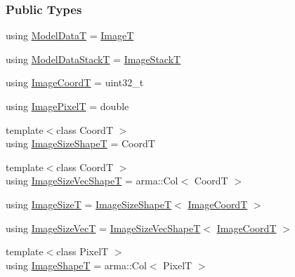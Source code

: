 \subsubsection*{Public Types}
\begin{DoxyCompactItemize}
\item 
using \hyperlink{classmappel_1_1PoissonNoise1DObjective_a0f72eebcb9fb785a5489fc5489bff9b0}{Model\+DataT} = \hyperlink{classmappel_1_1ImageFormat1DBase_a521a1ff391a52a636fac4aac7c7ba02c}{ImageT}
\item 
using \hyperlink{classmappel_1_1PoissonNoise1DObjective_a62f5cb009e4c0e53fdfbf90b3153b94f}{Model\+Data\+StackT} = \hyperlink{classmappel_1_1ImageFormat1DBase_a81e3246d1c5c37ebf9077b7b5bd25a76}{Image\+StackT}
\item 
using \hyperlink{classmappel_1_1ImageFormat1DBase_a82ab3168eb1a87eaeb3e7c919188e9fc}{Image\+CoordT} = uint32\+\_\+t
\item 
using \hyperlink{classmappel_1_1ImageFormat1DBase_a156fe500fd249cb4b77bdb0abc0dd0ea}{Image\+PixelT} = double
\item 
{\footnotesize template$<$class CoordT $>$ }\\using \hyperlink{classmappel_1_1ImageFormat1DBase_ab722bbd223963861691ef038721b6e02}{Image\+Size\+ShapeT} = CoordT
\item 
{\footnotesize template$<$class CoordT $>$ }\\using \hyperlink{classmappel_1_1ImageFormat1DBase_a3c584ee68fa44dc10de2edbc3d9882bb}{Image\+Size\+Vec\+ShapeT} = arma\+::\+Col$<$ CoordT $>$
\item 
using \hyperlink{classmappel_1_1ImageFormat1DBase_a6456bab2b26702022ee32ae19e90dcac}{Image\+SizeT} = \hyperlink{classmappel_1_1ImageFormat1DBase_ab722bbd223963861691ef038721b6e02}{Image\+Size\+ShapeT}$<$ \hyperlink{classmappel_1_1ImageFormat1DBase_a82ab3168eb1a87eaeb3e7c919188e9fc}{Image\+CoordT} $>$
\item 
using \hyperlink{classmappel_1_1ImageFormat1DBase_a5114a360a9bfcc4b5bc498c4600452f7}{Image\+Size\+VecT} = \hyperlink{classmappel_1_1ImageFormat1DBase_a3c584ee68fa44dc10de2edbc3d9882bb}{Image\+Size\+Vec\+ShapeT}$<$ \hyperlink{classmappel_1_1ImageFormat1DBase_a82ab3168eb1a87eaeb3e7c919188e9fc}{Image\+CoordT} $>$
\item 
{\footnotesize template$<$class PixelT $>$ }\\using \hyperlink{classmappel_1_1ImageFormat1DBase_a20d315459b83c348b1465614699783b3}{Image\+ShapeT} = arma\+::\+Col$<$ PixelT $>$
\item 

\end{DoxyCompactItemize}
